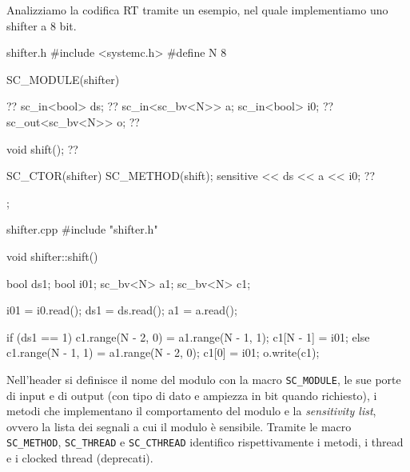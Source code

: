 \documentclass[10pt,a4paper,oneside]{scrbook}
\begin{document}
Analizziamo la codifica RT tramite un esempio, nel quale implementiamo uno shifter a 8 bit.
\begin{systemc}{shifter.h}
#include <systemc.h>
#define N 8

SC_MODULE(shifter) {  ??
  sc_in<bool> ds; ??
  sc_in<sc_bv<N>> a;
  sc_in<bool> i0; ??
  sc_out<sc_bv<N>> o; ??

  void shift(); ??

  SC_CTOR(shifter) {
    SC_METHOD(shift);
    sensitive << ds << a << i0; ??
  }
};
\end{systemc}
\begin{systemc}{shifter.cpp}
#include "shifter.h"

void shifter::shift() {
  bool ds1;
  bool i01;
  sc_bv<N> a1;
  sc_bv<N> c1;

  i01 = i0.read();
  ds1 = ds.read();
  a1 = a.read();

  if (ds1 == 1) {
    c1.range(N - 2, 0) = a1.range(N - 1, 1);
    c1[N - 1] = i01;
  } else {
    c1.range(N - 1, 1) = a1.range(N - 2, 0);
    c1[0] = i01;
  }
  o.write(c1);
}
\end{systemc}
Nell'header si definisce il nome del modulo con la macro \texttt{SC\_MODULE}, le sue porte di input e di output (con tipo di dato e ampiezza in bit quando
richiesto), i metodi che implementano il comportamento del modulo e la \textit{sensitivity list}, ovvero la lista dei segnali a cui il modulo è sensibile.
Tramite le macro \texttt{SC\_METHOD}, \texttt{SC\_THREAD} e \texttt{SC\_CTHREAD} identifico rispettivamente i metodi, i thread e i clocked thread (deprecati).
\end{document}
